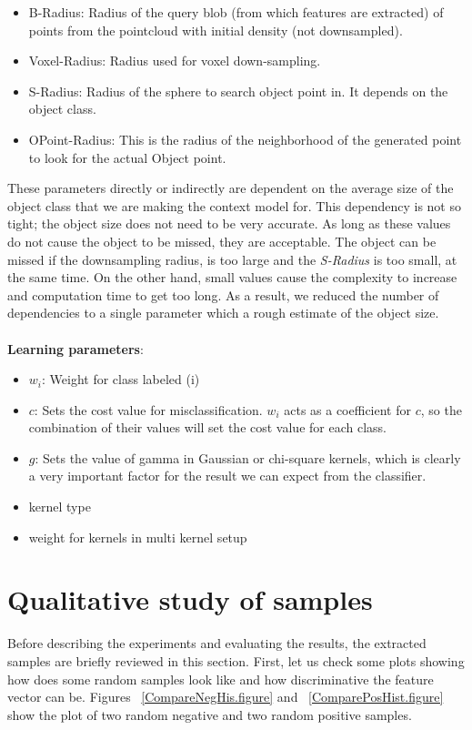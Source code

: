 \begin{itemize}
 \item  B-Radius: Radius of the query blob (from which features are extracted) of points from the pointcloud with initial density (not downsampled).
 \item Voxel-Radius: Radius used for voxel down-sampling. 
 \item S-Radius: Radius of the sphere to search object point in. 
 It depends on the object class.
 \item OPoint-Radius: This is the radius of the neighborhood of the generated point to look for the actual Object point.
\end{itemize}

These parameters directly or indirectly are dependent on the average size of the object class that we are making the context model
for. 
This dependency is not so tight; the object size does not need to be very accurate. 
As long as these values do not cause the object to be missed, they are acceptable.
The object can be missed if the downsampling radius, is too large and the {\it S-Radius} is too small, at the same time. 
On the other hand, small values cause the complexity to increase and computation time to get too long.  
As a result, we reduced the number of dependencies to a single parameter which a rough estimate of the object size.\\
\\
{\bf Learning parameters}:
\begin{itemize}
 \item $w_i$: Weight for class labeled (i)
 \item $c$: Sets the cost value for misclassification.
 $w_i$ acts as a coefficient for $c$, so the combination of their values will set the cost value for each class.
 \item $g$: Sets the value of gamma in Gaussian or chi-square kernels, which is clearly a very important factor for the result we can 
expect from the classifier. 
 \item kernel type
 \item weight for kernels in multi kernel setup
\end{itemize}


\section{Qualitative study of samples}
\label{QStudy.ssec}

Before describing the experiments and evaluating the results, the extracted samples are briefly reviewed in this section. First, let us check some plots showing how does some random samples look like and how discriminative the feature vector  
can be.
Figures ~\ref{CompareNegHis.figure} and ~\ref{ComparePosHist.figure} show the plot of two random negative and two random 
positive samples.   

